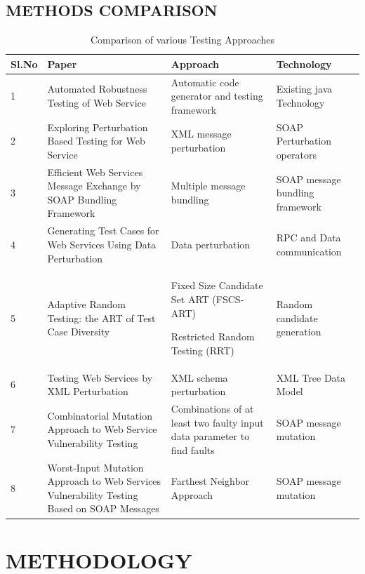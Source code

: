 \documentclass{bredelebeamer}
\begin{document}
\subsection{METHODS COMPARISON}
\begin{table}[H]
	\small
	\caption{Comparison of various Testing Approaches}
	\begin{tabular} {|m{.40cm}|m{3cm} | m{3.2cm} | m{3.0cm}|} %
		\hline \textbf{Sl.No} & \textbf{Paper} & \textbf{Approach} & \textbf{Technology}  \\ 
		\hline 1 & Automated Robustness Testing of Web Service & Automatic code generator and testing framework & Existing java Technology \\
		\hline 2 & Exploring Perturbation Based Testing for Web
		Service & XML message perturbation & SOAP Perturbation operators   \\ 
		\hline 3 & Efficient Web Services Message Exchange
		by SOAP Bundling Framework & Multiple message bundling  & SOAP message bundling framework  \\ 
		\hline 4 & Generating Test Cases for Web Services Using Data Perturbation & Data perturbation & RPC and Data communication \\ 
		\hline 5 & Adaptive Random Testing: the ART of Test
		Case Diversity &  Fixed Size Candidate Set ART (FSCS-ART) 
		
		Restricted Random Testing (RRT) & Random candidate generation  \\ 
		\hline 6 & Testing Web Services by XML Perturbation & XML schema perturbation  & XML Tree Data Model  \\ 
		\hline 7 & Combinatorial Mutation Approach to Web
		Service Vulnerability Testing & Combinations of at
		least two faulty input data parameter to find faults  & SOAP message mutation  \\ 
		\hline 8 & Worst-Input Mutation Approach to Web Services Vulnerability Testing Based on SOAP Messages & Farthest Neighbor Approach & SOAP message mutation \\
		\hline 
	\end{tabular} 
\end{table}
\framebreak
\section{METHODOLOGY}
\begin{frame}
	
	
\end{frame}
\end{document}
